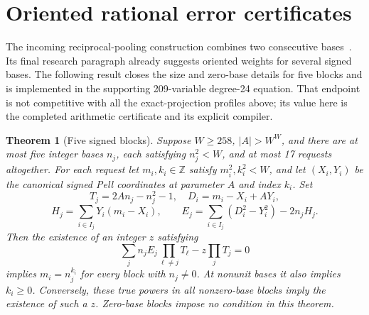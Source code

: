 \documentclass[11pt]{article}
\newtheorem{theorem}{Theorem}[section]
\newcommand{\Z}{\mathbb Z}
\begin{document}
\section{Oriented rational error certificates}\label{sec:pooling}

The incoming reciprocal-pooling construction combines two consecutive
bases~\cite{p168}. Its final research paragraph already suggests
oriented weights for several signed bases. The following result closes
the size and zero-base details for five blocks and is implemented in
the supporting 209-variable degree-24 equation. That endpoint is not
competitive with all the exact-projection profiles above; its value
here is the completed arithmetic certificate and its explicit compiler.

\begin{theorem}[Five signed blocks]\label{thm:pooling}
Suppose $W\ge258$, $|A|>W^W$, and there are at most five integer bases
$n_j$, each satisfying $n_j^2<W$, and at most 17 requests altogether.
For each request let $m_i,k_i\in\Z$ satisfy $m_i^2,k_i^2<W$, and let $(X_i,Y_i)$ be
the canonical signed Pell coordinates at parameter $A$ and index $k_i$.
Set
\[
 T_j=2An_j-n_j^2-1,\quad D_i=m_i-X_i+AY_i,
\]
\[
 H_j=\sum_{i\in I_j}Y_i(m_i-X_i),\qquad
 E_j=\sum_{i\in I_j}(D_i^2-Y_i^2)-2n_jH_j.
\]
Then the existence of an integer $z$ satisfying
\begin{equation}\label{eq:oriented}
 \sum_j n_jE_j\prod_{\ell\ne j}T_\ell
                  -z\prod_jT_j=0
\end{equation}
implies $m_i=n_j^{k_i}$ for every block with $n_j\ne0$.
At nonunit bases it also implies $k_i\ge0$. Conversely, these true
powers in all nonzero-base blocks imply the existence of such a $z$.
Zero-base blocks impose no condition in this theorem.
\end{theorem}
\end{document}
